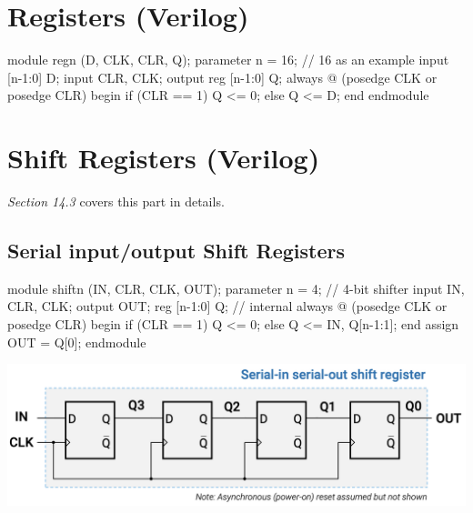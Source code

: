 \documentclass[12pt,openany]{book}
\begin{document}
\section{Registers (Verilog)}
\begin{vhdl}
module regn (D, CLK, CLR, Q);
parameter n = 16; // 16 as an example
input [n-1:0] D;
input CLR, CLK;
output reg [n-1:0] Q;
always @ (posedge CLK or posedge CLR)
	begin
		if (CLR == 1)
			Q <= 0;
	else
		Q <= D;
end
endmodule
\end{vhdl}


\section{Shift Registers (Verilog)}
\vspace*{-10px}
\textit{Section 14.3} covers this part in details.
\subsection{Serial input/output Shift Registers}
\begin{minipage}{0.4\textwidth}
	\begin{vhdl}
module shiftn (IN, CLR, CLK, OUT);
	parameter n = 4; // 4-bit shifter
	input IN, CLR, CLK;
	output OUT;
	reg [n-1:0] Q; // internal
	always @ (posedge CLK or posedge CLR)
		begin
			if (CLR == 1) Q <= 0;
			else Q <= {IN, Q[n-1:1]};
		end
	assign OUT = Q[0];
endmodule
	\end{vhdl}
\end{minipage}
\hfill
\hspace*{-4em}
\vline
\hfill
\hspace*{-8em}
\begin{minipage}{0.3\textwidth}
\includegraphics[width=1.3\textwidth]{circuits/14.1.2.png}
\end{minipage}
\end{document}
